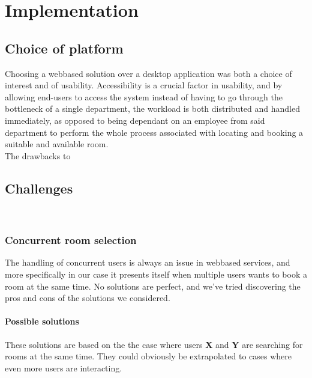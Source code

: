 \chapter{Implementation}

\section{Choice of platform}
Choosing a webbased solution over a desktop application was both a choice of interest and of usability. Accessibility is a crucial factor in usability, and by allowing end-users to access the system instead of having to go through the bottleneck of a single department, the workload is both distributed and handled immediately, as opposed to being dependant on an employee from said department to perform the whole process associated with locating and booking a suitable and available room.
\\
The drawbacks to 


\section{Challenges}
\label{sec:challenges}
\\
\subsection{Concurrent room selection}
The handling of concurrent users is always an issue in webbased services, and more specifically in our case it presents itself when multiple users wants to book a room at the same time. No solutions are perfect, and we've tried discovering the pros and cons of the solutions we considered.

\subsubsection*{Possible solutions}
These solutions are based on the the case where users \textbf{X} and \textbf{Y} are searching for rooms at the same time. They could obviously be extrapolated to cases where even more users are interacting. 
